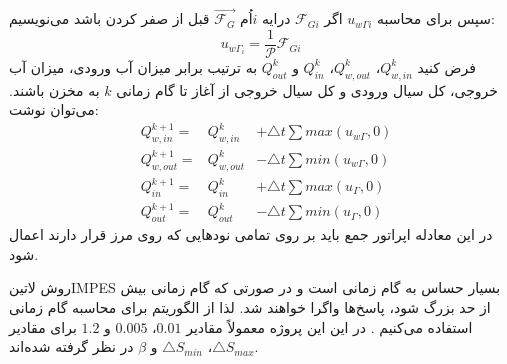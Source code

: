 سپس برای محاسبه $u_{w\Gamma i}$ اگر $\mathcal F_{Gi} $ درایه $i$اُم $\vec {\mathcal F_{G}}$ قبل از صفر کردن باشد می‌نویسیم:
\begin{equation}
\label{eq:3bnd9}
u_{w\Gamma_i}= \frac{1}{\mathcal P} \mathcal F_{Gi} 
\end{equation}
فرض کنید 
$Q^k_{w,in}$، $Q^k_{w,out}$، $Q^k_{in}$  و $Q^k_{out}$
به ترتیب برابر میزان آب ورودی، میزان آب خروجی، کل سیال ورودی و کل سیال خروجی از آغاز تا گام زمانی $k$ به مخزن باشند. می‌توان نوشت:
\begin{equation}
\begin{aligned}
\label{eq:3bnd10}
&Q^{k+1}_{w,in} = &Q^k_{w,in} &+ \triangle t\sum max(u_{w\Gamma} , 0) \\
&Q^{k+1}_{w,out} = &Q^k_{w,out} &-\triangle t\sum min(u_{w\Gamma} , 0) \\
&Q^{k+1}_{in} = &Q^k_{in} &+\triangle t\sum max(u_{\Gamma} , 0) \\
&Q^{k+1}_{out} = &Q^k_{out} &-\triangle t\sum min(u_{\Gamma} , 0)
\end{aligned}
\end{equation}
در این معادله اپراتور جمع باید بر روی تمامی نود‌هایی که روی مرز قرار دارند اعمال شود.

روش ‌لاتین{IMPES} بسیار حساس به گام زمانی است و در صورتی که گام زمانی بیش از حد بزرگ شود، پاسخ‌ها واگرا خواهند شد. لذا از الگوریتم  برای محاسبه گام زمانی استفاده می‌کنیم . در این این پروژه معمولاً مقادیر $0.01$، $0.005$ و $1.2$ برای مقادیر
 $\triangle S_{max}$،   $\triangle S_{min}$ و $\beta$
در نظر گرفته شده‌اند.

